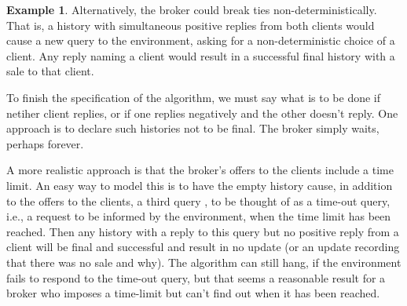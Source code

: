 \documentclass{LMCS}
\theoremstyle{definition}
\newtheorem{ex}[thm]{Example}
\begin{document}
\begin{ex}
Alternatively, the broker could break ties non-deterministically.
That is, a history with simultaneous positive replies from both
clients would cause a new query to the environment, asking for a
non-deterministic choice of a client.  Any reply naming a client
would result in a successful final history with a sale to that
client.  

To finish the specification of the algorithm, we must say what is to
be done if netiher client replies, or if one replies negatively and
the other doesn't reply.  One approach is to declare such histories
not to be final.  The broker simply waits, perhaps forever.  

A more realistic approach is that the broker's offers to the clients
include a time limit.  An easy way to model this is to have the empty
history cause, in addition to the offers to the clients, a third query
, to be thought of as a time-out query, i.e., a request to be
informed by the environment, when the time limit has been reached.
Then any history with a reply to this query but no positive reply from
a client will be final and successful and result in no update (or an
update recording that there was no sale and why).  The algorithm can
still hang, if the environment fails to respond to the time-out query,
but that seems a reasonable result for a broker who imposes a
time-limit but can't find out when it has been reached.
\end{ex}
\end{document}
